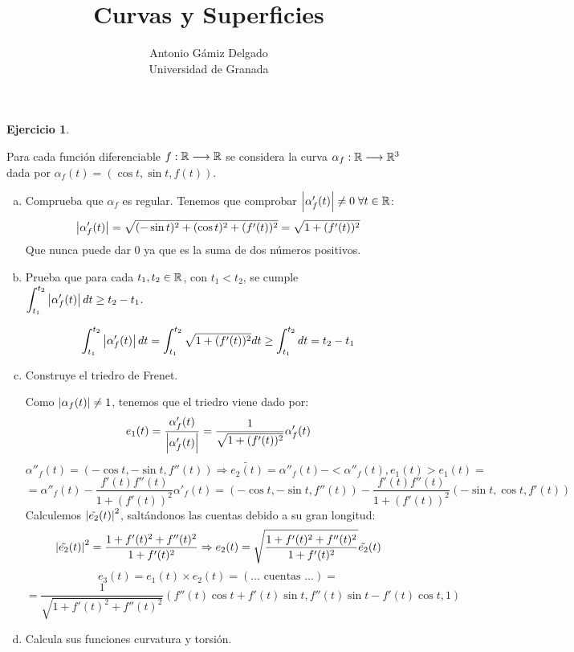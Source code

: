 \documentclass[12pt]{article}
\newtheorem{ejercicio}[theorem]{Ejercicio}
\theoremstyle{definition}
\theoremstyle{remark}
\begin{document}
\title{Curvas y Superficies}
\author{Antonio Gámiz Delgado\\ Universidad de Granada} 
 
\maketitle

\begin{ejercicio}

\end{ejercicio}
Para cada función diferenciable $f : \mathbb{R} \longrightarrow \mathbb{R}$ se considera la curva $\alpha_f : \mathbb{R} \longrightarrow \mathbb{R}^3$ dada por $\alpha_f(t)=(\cos t,\sin t, f(t))$.
\begin{enumerate}[(a)]
\item Comprueba que $\alpha_f$ es regular.
Tenemos que comprobar $\left| \alpha'_f(t) \right|\neq 0 \; \forall t\in\mathbb{R}$:
\[
\left| \alpha'_f(t) \right|=\sqrt{(-\sin t)^2+(\cos t)^2+(f'(t))^2}=\sqrt{1+(f'(t))^2}
\]
Que nunca puede dar 0 ya que es la suma de dos números positivos.
\item Prueba que para cada $t_1,t_2\in\mathbb{R}$, con $t_1<t_2$, se cumple $\displaystyle\int_{ t_1 }^{ t_2 } \left| \alpha'_{f}(t) \right|dt\geq t_2-t_1$.

\[
\displaystyle\int_{ t_1 }^{ t_2 } \left| \alpha'_{f}(t) \right|dt=\displaystyle\int_{ t_1 }^{ t_2 } \sqrt{1+(f'(t))^2}dt\geq\displaystyle\int_{ t_1 }^{ t_2 } dt=t_2-t_1
\]

\item Construye el triedro de Frenet.

Como $\left| \alpha_f(t) \right|\neq 1$, tenemos que el triedro viene dado por:
\[
e_1(t)=\frac{\alpha'_f(t)}{\left| \alpha'_f(t) \right|}=\frac{1}{\sqrt{1+(f'(t))^2}}\alpha'_f(t)
\]
\[
\alpha''_f(t)=(-\cos t,-\sin t,f''(t)) \Rightarrow \tilde{e_2(t)}= \alpha''_f(t)-<\alpha''_f(t),e_1(t)>e_1(t)=
\]
\[
=\alpha''_f(t)-\frac{f'(t)f''(t)}{1+(f'(t))^2}\alpha'_f(t)=(-\cos t,-\sin t,f''(t))-\frac{f'(t)f''(t)}{1+(f'(t))^2}(-\sin t,\cos t,f'(t))
\]
Calculemos $\left| \tilde{e_2}(t) \right|^2$, saltándonos las cuentas debido a su gran longitud:
\[
\left| \tilde{e_2}(t) \right|^2 = \frac{1+f'(t)^2+f''(t)^2}{1+f'(t)^2}\Rightarrow e_2(t)=\sqrt{\frac{1+f'(t)^2+f''(t)^2}{1+f'(t)^2}}\tilde{e_2}(t)
\]
\[
e_3(t)=e_1(t)\times e_2(t)=(...\text{ cuentas }...) = 
\]
\[
=\frac{1}{\sqrt{1+f'(t)^2+f''(t)^2}}(f''(t)\cos t+f'(t)\sin t, f''(t)\sin t-f'(t)\cos t, 1)
\]

\item Calcula sus funciones curvatura y torsión.


\end{enumerate}
\end{document}
